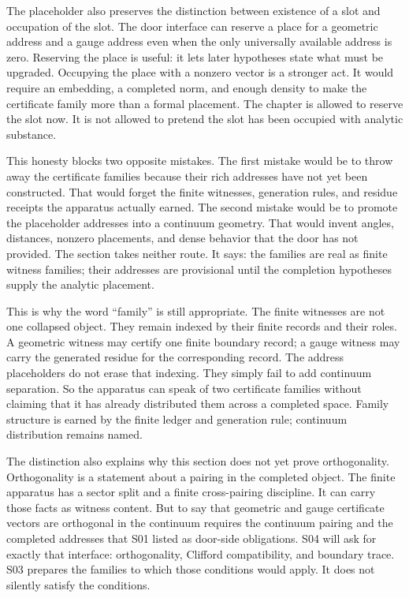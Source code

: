 The placeholder also preserves the distinction between existence of a slot and
occupation of the slot. The door interface can reserve a place for a geometric
address and a gauge address even when the only universally available address is
zero. Reserving the place is useful: it lets later hypotheses state what must
be upgraded. Occupying the place with a nonzero vector is a stronger act. It
would require an embedding, a completed norm, and enough density to make the
certificate family more than a formal placement. The chapter is allowed to
reserve the slot now. It is not allowed to pretend the slot has been occupied
with analytic substance.

This honesty blocks two opposite mistakes. The first mistake would be to throw
away the certificate families because their rich addresses have not yet been
constructed. That would forget the finite witnesses, generation rules, and
residue receipts the apparatus actually earned. The second mistake would be to
promote the placeholder addresses into a continuum geometry. That would invent
angles, distances, nonzero placements, and dense behavior that the door has not
provided. The section takes neither route. It says: the families are real as
finite witness families; their addresses are provisional until the completion
hypotheses supply the analytic placement.

This is why the word ``family'' is still appropriate. The finite witnesses are
not one collapsed object. They remain indexed by their finite records and
their roles. A geometric witness may certify one finite boundary record; a
gauge witness may carry the generated residue for the corresponding record.
The address placeholders do not erase that indexing. They simply fail to add
continuum separation. So the apparatus can speak of two certificate families
without claiming that it has already distributed them across a completed
space. Family structure is earned by the finite ledger and generation rule;
continuum distribution remains named.

The distinction also explains why this section does not yet prove
orthogonality. Orthogonality is a statement about a pairing in the completed
object. The finite apparatus has a sector split and a finite cross-pairing
discipline. It can carry those facts as witness content. But to say that
geometric and gauge certificate vectors are orthogonal in the continuum
requires the continuum pairing and the completed addresses that S01 listed as
door-side obligations. S04 will ask for exactly that interface: orthogonality,
Clifford compatibility, and boundary trace. S03 prepares the families to which
those conditions would apply. It does not silently satisfy the conditions.

